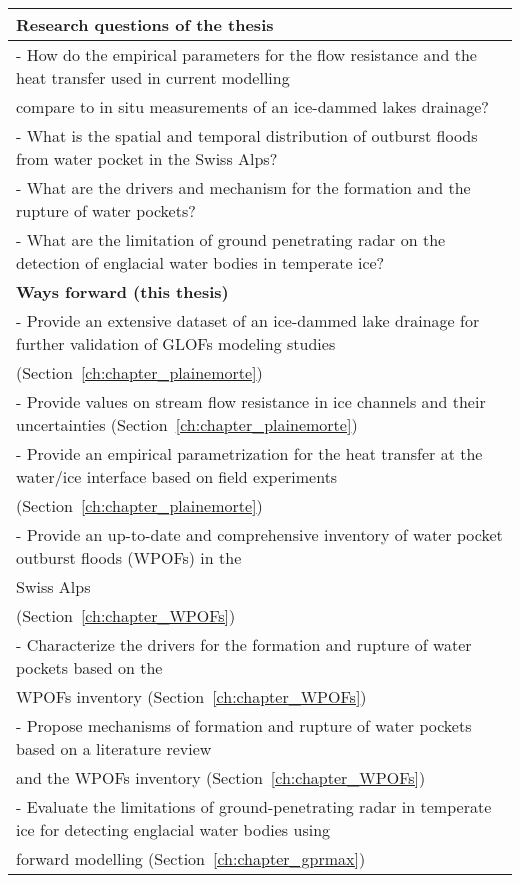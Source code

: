\begin{table}[h]
\begin{tabular}{l}
\hline
\textbf{Research questions of the thesis}  \\
\hline
- How do the empirical parameters for the flow resistance and the heat transfer used in current modelling\\ compare to in situ measurements of an ice-dammed lakes drainage?\\
- What is the spatial and temporal distribution of outburst floods from water pocket in the Swiss Alps?\\
- What are the drivers and mechanism for the formation and the rupture of water pockets?\\
- What are the limitation of ground penetrating radar on the detection of englacial water bodies in temperate ice?\\


\hline
\textbf{Ways forward (this thesis)}  \\
\hline
- Provide an extensive dataset of an ice-dammed lake drainage for further validation of GLOFs modeling studies\\ (Section~\ref{ch:chapter_plainemorte}) \\
- Provide values on stream flow resistance in ice channels and their uncertainties (Section~\ref{ch:chapter_plainemorte}) \\
- Provide an empirical parametrization for the heat transfer at the water/ice interface based on field experiments\\  (Section~\ref{ch:chapter_plainemorte}) \\
- Provide an up-to-date and comprehensive inventory of water pocket outburst floods (WPOFs) in the\\ Swiss Alps\\ (Section~\ref{ch:chapter_WPOFs}) \\
- Characterize the drivers for the formation and rupture of water pockets based on the\\ WPOFs inventory (Section~\ref{ch:chapter_WPOFs}) \\
- Propose mechanisms of formation and rupture of water pockets based on a literature review\\ and the WPOFs inventory (Section~\ref{ch:chapter_WPOFs}) \\
- Evaluate the limitations of ground-penetrating radar in temperate ice for detecting englacial water bodies using\\ forward modelling (Section~\ref{ch:chapter_gprmax}) \\

\hline
\end{tabular}
\label{table_GLOFs_research_gaps}
\end{table}



